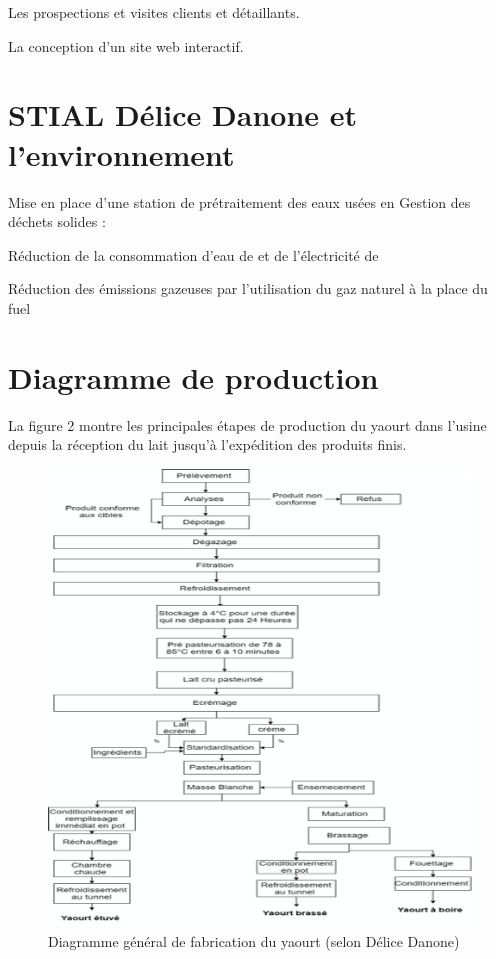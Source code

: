 \begin{spacing}{1.2}
Les prospections et visites clients et détaillants.


La conception d’un site web interactif.

\section{STIAL Délice Danone et l’environnement}
Mise en place d’une station de prétraitement des eaux usées en
Gestion des déchets solides :


Réduction de la consommation d’eau de et de l’électricité de


Réduction des émissions gazeuses par l’utilisation du gaz naturel à la place du fuel

\section{Diagramme de  production}
La figure 2  montre les principales étapes de production du yaourt  dans l’usine depuis la réception du lait jusqu'à l’expédition des produits finis.

\begin{figure}[!ht]\centering
\includegraphics[scale=0.9]{fabrication_yaourt.png}
\caption{Diagramme général de fabrication du yaourt (selon Délice Danone)}
\label{fig:fig1}
\end{figure}




\end{spacing}
